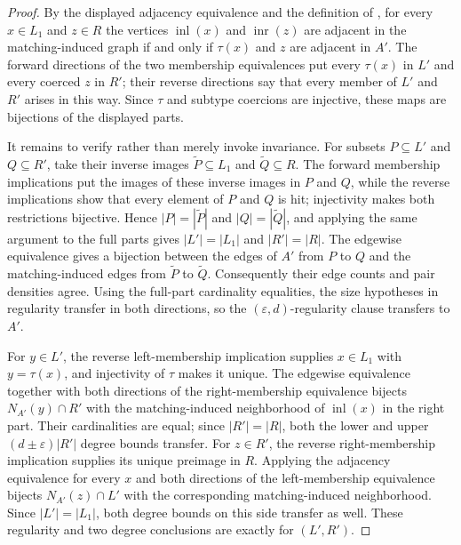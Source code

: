 \begin{proof}
By the displayed adjacency equivalence and the definition of , for every $x\in L_1$ and $z\in R$ the vertices $\operatorname{inl}(x)$ and $\operatorname{inr}(z)$ are adjacent in the matching-induced graph if and only if $\tau(x)$ and $z$ are adjacent in $A'$.  The forward directions of the two membership equivalences put every $\tau(x)$ in $L'$ and every coerced $z$ in $R'$; their reverse directions say that every member of $L'$ and $R'$ arises in this way.  Since $\tau$ and subtype coercions are injective, these maps are bijections of the displayed parts.

It remains to verify rather than merely invoke invariance.  For subsets $P\subseteq L'$ and $Q\subseteq R'$, take their inverse images $\widetilde P\subseteq L_1$ and $\widetilde Q\subseteq R$.  The forward membership implications put the images of these inverse images in $P$ and $Q$, while the reverse implications show that every element of $P$ and $Q$ is hit; injectivity makes both restrictions bijective.  Hence $|P|=|\widetilde P|$ and $|Q|=|\widetilde Q|$, and applying the same argument to the full parts gives $|L'|=|L_1|$ and $|R'|=|R|$.  The edgewise equivalence gives a bijection between the edges of $A'$ from $P$ to $Q$ and the matching-induced edges from $\widetilde P$ to $\widetilde Q$.  Consequently their edge counts and pair densities agree.  Using the full-part cardinality equalities, the size hypotheses in regularity transfer in both directions, so the $(\varepsilon,d)$-regularity clause transfers to $A'$.

For $y\in L'$, the reverse left-membership implication supplies $x\in L_1$ with $y=\tau(x)$, and injectivity of $\tau$ makes it unique.  The edgewise equivalence together with both directions of the right-membership equivalence bijects $N_{A'}(y)\cap R'$ with the matching-induced neighborhood of $\operatorname{inl}(x)$ in the right part.  Their cardinalities are equal; since $|R'|=|R|$, both the lower and upper $(d\pm\varepsilon)|R'|$ degree bounds transfer.  For $z\in R'$, the reverse right-membership implication supplies its unique preimage in $R$.  Applying the adjacency equivalence for every $x$ and both directions of the left-membership equivalence bijects $N_{A'}(z)\cap L'$ with the corresponding matching-induced neighborhood.  Since $|L'|=|L_1|$, both degree bounds on this side transfer as well.  These regularity and two degree conclusions are exactly  for $(L',R')$.
\end{proof}
